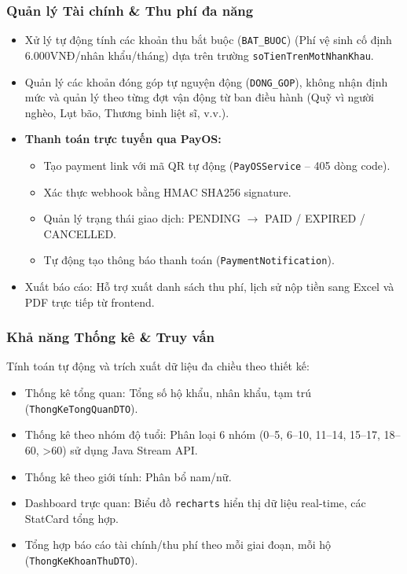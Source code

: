\documentclass[12pt,a4paper]{article}
\begin{document}
\subsubsection{Quản lý Tài chính \& Thu phí đa năng}
\begin{itemize}
    \item Xử lý tự động tính các khoản thu bắt buộc (\texttt{BAT\_BUOC}) (Phí vệ sinh cố định 6.000VNĐ/nhân khẩu/tháng) dựa trên trường \texttt{soTienTrenMotNhanKhau}.
    \item Quản lý các khoản đóng góp tự nguyện động (\texttt{DONG\_GOP}), không nhận định mức và quản lý theo từng đợt vận động từ ban điều hành (Quỹ vì người nghèo, Lụt bão, Thương binh liệt sĩ, v.v.).
    \item \textbf{Thanh toán trực tuyến qua PayOS:} 
    \begin{itemize}
        \item Tạo payment link với mã QR tự động (\texttt{PayOSService} -- 405 dòng code).
        \item Xác thực webhook bằng HMAC SHA256 signature.
        \item Quản lý trạng thái giao dịch: PENDING $\rightarrow$ PAID / EXPIRED / CANCELLED.
        \item Tự động tạo thông báo thanh toán (\texttt{PaymentNotification}).
    \end{itemize}
    \item Xuất báo cáo: Hỗ trợ xuất danh sách thu phí, lịch sử nộp tiền sang Excel và PDF trực tiếp từ frontend.
\end{itemize}

\subsubsection{Khả năng Thống kê \& Truy vấn}
Tính toán tự động và trích xuất dữ liệu đa chiều theo thiết kế:
\begin{itemize}
    \item Thống kê tổng quan: Tổng số hộ khẩu, nhân khẩu, tạm trú (\texttt{ThongKeTongQuanDTO}).
    \item Thống kê theo nhóm độ tuổi: Phân loại 6 nhóm (0--5, 6--10, 11--14, 15--17, 18--60, >60) sử dụng Java Stream API.
    \item Thống kê theo giới tính: Phân bổ nam/nữ.
    \item Dashboard trực quan: Biểu đồ \texttt{recharts} hiển thị dữ liệu real-time, các StatCard tổng hợp.
    \item Tổng hợp báo cáo tài chính/thu phí theo mỗi giai đoạn, mỗi hộ (\texttt{ThongKeKhoanThuDTO}).
\end{itemize}
\end{document}
